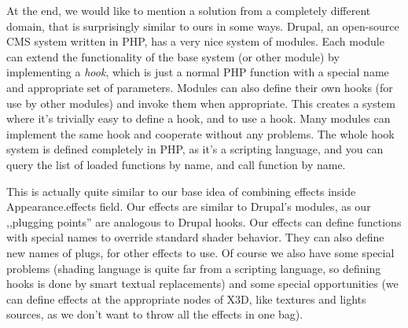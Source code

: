 \documentclass{acmsiggraph}                     %
\begin{document}

At the end, we would like to mention a solution from a completely
different domain, that is surprisingly similar to ours in some ways.
Drupal, an open-source CMS system written in PHP,
has a very nice system of modules. Each module
can extend the functionality of the base system (or other module)
by implementing a \textit{hook}, which is just a normal PHP function
with a special name and appropriate set of parameters. Modules can also define
their own hooks (for use by other modules) and invoke them when appropriate.
This creates a system where it's trivially easy to define a hook,
and to use a hook.
Many modules can implement the same hook and cooperate without any problems.
The whole hook system is defined completely in PHP, as it's a scripting
language, and you can query the list of loaded functions by name,
and call function by name.

This is actually quite similar to our base idea of combining effects
inside Appearance.effects field. Our effects are similar to
Drupal's modules, as our ,,plugging points'' are analogous to Drupal hooks.
Our effects can define functions with special names to override
standard shader behavior. They can also define new names of plugs, for other
effects to use. Of course we also have some special problems
(shading language is quite far from a scripting language,
so defining hooks is done by smart textual replacements)
and some special opportunities (we can define effects at
the appropriate nodes of X3D, like textures and lights sources,
as we don't want to throw all the effects in one bag).
\end{document}
